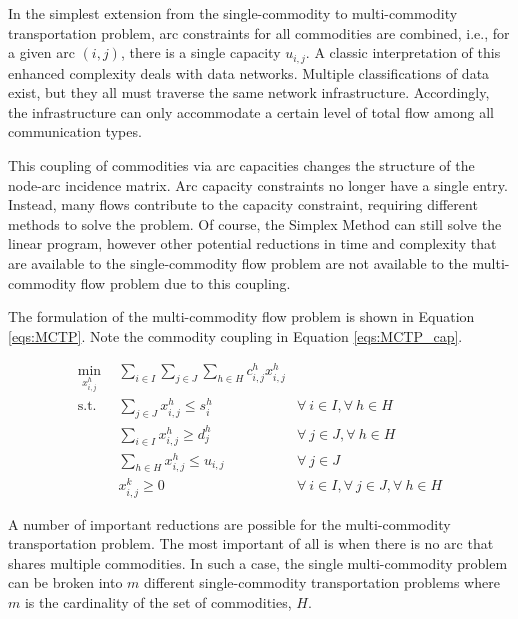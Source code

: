 In the simplest extension from the single-commodity to multi-commodity
transportation problem, arc constraints for all commodities are combined, i.e.,
for a given arc $(i, j)$, there is a single capacity $u_{i,j}$. A classic
interpretation of this enhanced complexity deals with data networks. Multiple
classifications of data exist, but they all must traverse the same network
infrastructure. Accordingly, the infrastructure can only accommodate a certain
level of total flow among all communication types.

This coupling of commodities via arc capacities changes the structure of the
node-arc incidence matrix. Arc capacity constraints no longer have a single
entry. Instead, many flows contribute to the capacity constraint, requiring
different methods to solve the problem. Of course, the Simplex Method can still
solve the linear program, however other potential reductions in time and
complexity that are available to the single-commodity flow problem are not
available to the multi-commodity flow problem due to this coupling.

The formulation of the multi-commodity flow problem is shown in Equation
\ref{eqs:MCTP}. Note the commodity coupling in Equation \ref{eqs:MCTP_cap}.

\begin{subequations}\label{eqs:MCTP}
  \begin{align}
    \min_{x_{i,j}^{h}} \:\: & 
    \sum_{i \in I}\sum_{j \in J}\sum_{h \in H} c_{i,j}^{h} x_{i,j}^{h}
    & \label{eqs:MCTP_obj} \\
    \text{s.t.} \:\: &
    \sum_{j \in J} x_{i,j}^{h} \leq s_{i}^{h}
    &
    \forall \: i \in I, \forall \: h \in H \label{eqs:MCTP_sup} \\
    &
    \sum_{i \in I} x_{i,j}^{h} \geq d_{j}^{h}
    & 
    \forall \: j \in J, \forall \: h \in H \label{eqs:MCTP_dem} \\
    &
    \sum_{h \in H} x_{i,j}^{h} \leq u_{i,j}
    & 
    \forall \: j \in J \label{eqs:MCTP_cap} \\
    &
    x_{i,j}^{k} \geq 0
    &
    \forall \: i \in I, \forall \: j \in J, \forall \: h \in H \label{eqs:MCTP_x}
  \end{align}
\end{subequations}

A number of important reductions are possible for the multi-commodity
transportation problem. The most important of all is when there is no arc that
shares multiple commodities. In such a case, the single multi-commodity problem
can be broken into $m$ different single-commodity transportation problems where
$m$ is the cardinality of the set of commodities, $H$.
